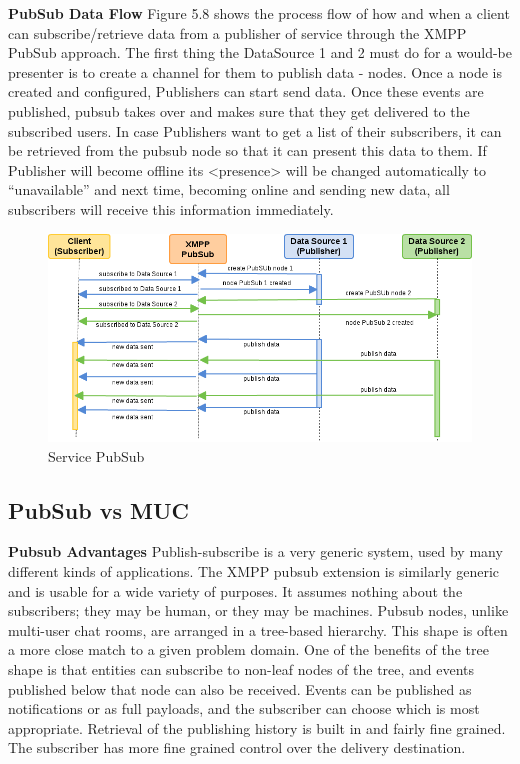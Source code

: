 \textbf{PubSub Data Flow}
\newline
Figure 5.8 shows the process flow of how and when a client can subscribe/retrieve data from a publisher of service through the XMPP PubSub approach. The first thing the DataSource 1 and 2 must do for a would-be presenter is to create a channel for them to publish data - nodes. Once a node is created and configured, Publishers can start send data. Once these events are published, pubsub takes over and makes sure that they get delivered to the subscribed users. In case Publishers want to get a list of their subscribers, it can be retrieved from the pubsub node so that it can present this data to them. If Publisher will become offline its <presence> will be changed automatically to ``unavailable'' and next time, becoming online and sending new data, all subscribers will receive this information immediately.
    \begin{figure}[!ht]
    \centering
    \includegraphics[scale=0.6]{images/PubSub.png}   
    \caption[Service PubSub]{Service PubSub}
    \label{img:pub_sub}                           
    \end{figure}
	    
 \subsection{PubSub vs MUC}
	\textbf{Pubsub Advantages}
	\newline
	Publish-subscribe is a very generic system, used by many different kinds of applications. The XMPP pubsub extension is similarly generic and is usable for a wide variety of purposes. It assumes nothing about the subscribers; they may be human, or they may be machines. Pubsub nodes, unlike multi-user chat rooms, are arranged in a tree-based hierarchy. This shape is often a more close match to a given problem domain. One of the benefits of the tree shape is that entities can subscribe to non-leaf nodes of the tree, and events published below that node can also be received. Events can be published as notifications or as full payloads, and the subscriber can choose which is most appropriate. Retrieval of the publishing history is built in and fairly fine grained. The subscriber has more fine grained control over the delivery destination. 

